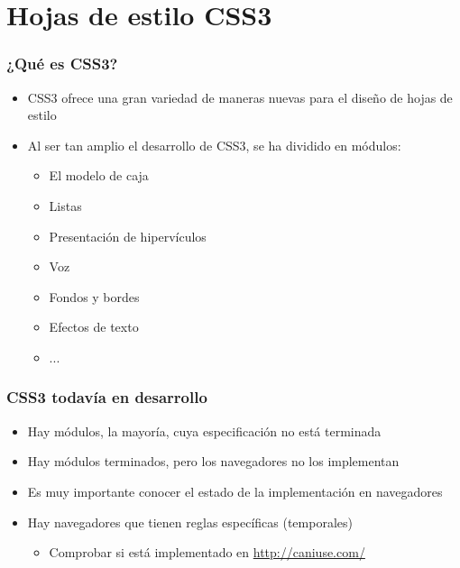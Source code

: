 %

\section{Hojas de estilo CSS3}



\begin{frame}
\frametitle{¿Qué es CSS3?}

\begin{itemize}
  \item CSS3 ofrece una gran variedad de maneras nuevas para el diseño de hojas de estilo
  \item Al ser tan amplio el desarrollo de CSS3, se ha dividido en módulos:
  \begin{itemize}
    \item El modelo de caja
    \item Listas
    \item Presentación de hipervículos
    \item Voz
    \item Fondos y bordes
    \item Efectos de texto
    \item ...
  \end{itemize}
\end{itemize}

\end{frame}



\begin{frame}
\frametitle{CSS3 todavía en desarrollo}

\begin{itemize}
  \item Hay módulos, la mayoría, cuya especificación no está terminada
  \item Hay módulos terminados, pero los navegadores no los implementan
  \item Es muy importante conocer el estado de la implementación en navegadores
  \item Hay navegadores que tienen reglas específicas (temporales)
  \begin{itemize}
    \item Comprobar si está implementado en \url{http://caniuse.com/}
  \end{itemize}
\end{itemize}

\end{frame}


